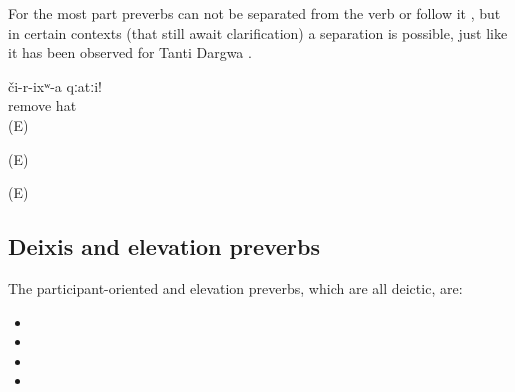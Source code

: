 For the most part preverbs can not be separated from the verb or follow it , but in certain contexts (that still await clarification) a separation is possible, just like it has been observed for Tanti Dargwa \citep[107]{Sumbatova.Lander2014} .

\begin{exe}

	\ex	\label{ex:Take off the hat verbs}
	\begin{xlist}
		\ex	\label{ex:Take off the hat verbs@A}
		\gll	či-r-ixʷ-a	qːatːi!\\
			remove	hat\\
		\glt	{} (E)

		\ex	{}	\label{ex:Take off the hat verbs@B}
		\glt	{} (E)

		\ex	{}	\label{ex:Take off the hat verbs@C}
		\glt	{} (E)
	\end{xlist}
\end{exe}



\subsection{Deixis and elevation preverbs}
\label{ssec:Deixis/gravitation preverbs}

The participant-oriented and elevation preverbs, which are all deictic, are:

\begin{itemize}
	\item	{} 
	\item	{} 
	\item	{} 
	\item	{} 
\end{itemize}


